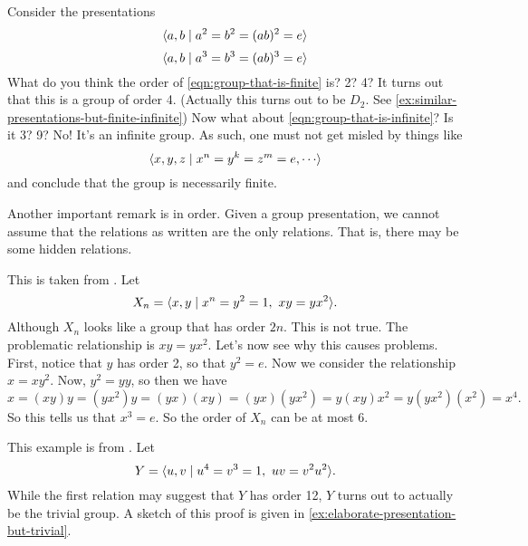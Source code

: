 \documentclass[./main.tex]{subfiles}
\begin{document}
\begin{example}
    Consider the presentations
    \begin{equation}
    \label{eqn:group-that-is-finite}
    { \langle a, b \mid a^2 = b^2 = (ab)^2 = e \rangle }
    \end{equation}
    \begin{equation}
    \label{eqn:group-that-is-infinite}
    { \langle a, b \mid a^3 = b ^3 = (ab)^3 = e \rangle }
    \end{equation}
    What do you think the order of \cref{eqn:group-that-is-finite} is? 2? 4? It
    turns out that this is a group of order 4. (Actually this turns out to be
    $D_2$. See \cref{ex:similar-presentations-but-finite-infinite}) Now what
    about \cref{eqn:group-that-is-infinite}? Is it 3? 9? No! It's an infinite
    group. As such, one must not get misled by things like 
    \[
        \gen{x, y, z \mid x^n = y^k = z^m = e, \cdots}
    \]
    and conclude that the group is necessarily finite.
\end{example}

Another important remark is in order. Given a group presentation, we cannot
assume that the relations as written are the only relations. That is, there may
be some hidden relations. 
\begin{example}
\label{example:hidden-relations-group}
    This is taken from \autocite[Eqn 1.2, \pno~26]{Dummit_Foote_2004}.
    Let 
    \[
        X_n = { \langle x, y \mid x^n = y^2 = 1, \,\, xy=yx^2 \rangle }. 
    \]
    Although $X_n$ looks like a group that has order $2n$. This is not true. The
    problematic relationship is $xy = yx^2$. Let's now see why this causes
    problems. First, notice that $y$ has order 2, so that $y^2 = e$. Now we
    consider the relationship $x = xy^2$. Now, $y^2 = yy$, so then we have
    \[
        x = (xy)y = (yx^2)y = (yx)(xy) = (yx)(yx^2) = y(xy)x^2 = y(yx^2)(x^2) = x^4.
    \]
    So this tells us that $x^3 = e$. So the order of $X_n$ can be at most 6. 
\end{example}

\begin{example}
\label{example:elaborate-presentation-but-trivial}
    This example is from \autocite[Eqn 1.3, \pno~27]{Dummit_Foote_2004}. Let 
    \[
        Y = { \langle u, v \mid u^4  = v^3 = 1, \,\, uv = v^2 u^2 \rangle }.
    \]
    While the first relation may suggest that $Y$ has order 12, $Y$ turns out to
    actually be the trivial group. A sketch of this proof is given in
    \cref{ex:elaborate-presentation-but-trivial}.
\end{example}
\end{document}
